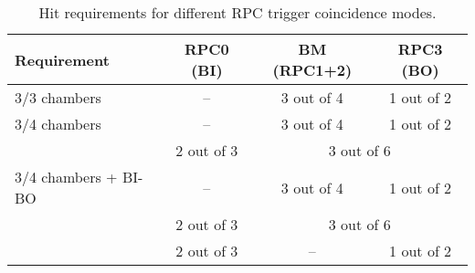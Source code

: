 \begin{table}[htbp]
  \centering
  \caption{Hit requirements for different RPC trigger coincidence modes.}
  \label{tab:RPC_coincidence_modes}
  \begin{tabular}{lccc}
    \hline
    Requirement & RPC0 (BI) & BM (RPC1+2) & RPC3 (BO) \\
    \hline
    3/3 chambers          & --         & 3 out of 4 & 1 out of 2 \\
    \hline
    3/4 chambers          & --         & 3 out of 4 & 1 out of 2 \\
                          & 2 out of 3 & \multicolumn{2}{c}{3 out of 6} \\
    \hline
    3/4 chambers + BI-BO  & --         & 3 out of 4 & 1 out of 2 \\
                          & 2 out of 3 & \multicolumn{2}{c}{3 out of 6} \\
                          & 2 out of 3 & --         & 1 out of 2 \\
    \hline
  \end{tabular}
\end{table}